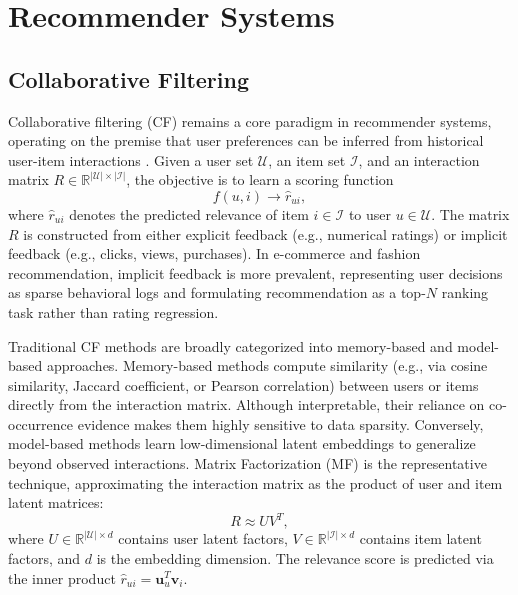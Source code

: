 \section{Recommender Systems}

\subsection{Collaborative Filtering}

Collaborative filtering (CF) remains a core paradigm in recommender systems, operating on the premise that user preferences can be inferred from historical user-item interactions \parencite{11359174}. Given a user set \(\mathcal{U}\), an item set \(\mathcal{I}\), and an interaction matrix \(R \in \mathbb{R}^{|\mathcal{U}| \times |\mathcal{I}|}\), the objective is to learn a scoring function
\begin{equation}
    f(u,i) \rightarrow \hat{r}_{ui},
\end{equation}
where \(\hat{r}_{ui}\) denotes the predicted relevance of item \(i \in \mathcal{I}\) to user \(u \in \mathcal{U}\). The matrix \(R\) is constructed from either explicit feedback (e.g., numerical ratings) or implicit feedback (e.g., clicks, views, purchases). In e-commerce and fashion recommendation, implicit feedback is more prevalent, representing user decisions as sparse behavioral logs and formulating recommendation as a top-\(N\) ranking task rather than rating regression.

Traditional CF methods are broadly categorized into memory-based and model-based approaches. Memory-based methods compute similarity (e.g., via cosine similarity, Jaccard coefficient, or Pearson correlation) between users or items directly from the interaction matrix. Although interpretable, their reliance on co-occurrence evidence makes them highly sensitive to data sparsity. Conversely, model-based methods learn low-dimensional latent embeddings to generalize beyond observed interactions. Matrix Factorization (MF) is the representative technique, approximating the interaction matrix as the product of user and item latent matrices:
\begin{equation}
    R \approx U V^{T},
\end{equation}
where \(U \in \mathbb{R}^{|\mathcal{U}| \times d}\) contains user latent factors, \(V \in \mathbb{R}^{|\mathcal{I}| \times d}\) contains item latent factors, and \(d\) is the embedding dimension. The relevance score is predicted via the inner product \(\hat{r}_{ui} = \mathbf{u}_{u}^{T}\mathbf{v}_{i}\).

